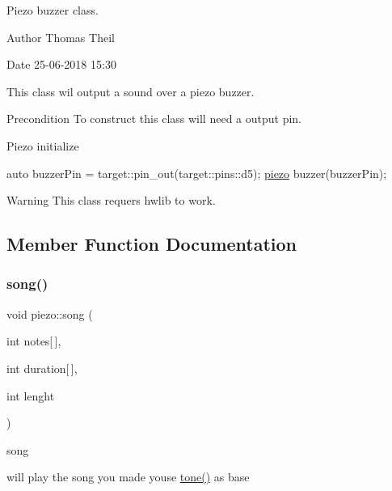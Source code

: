 Piezo buzzer class. 

\begin{DoxyAuthor}{Author}
Thomas Theil 
\end{DoxyAuthor}
\begin{DoxyDate}{Date}
25-\/06-\/2018 15\+:30
\end{DoxyDate}
This class wil output a sound over a piezo buzzer. ~\newline
 \begin{DoxyPrecond}{Precondition}
To construct this class will need a output pin. 
\end{DoxyPrecond}
Piezo initialize 
\begin{DoxyCode}
\textcolor{keyword}{auto} buzzerPin  = target::pin\_out(target::pins::d5);
\mbox{\hyperlink{classpiezo}{piezo}} buzzer(buzzerPin);
\end{DoxyCode}


\begin{DoxyWarning}{Warning}
This class requers hwlib to work. 
\end{DoxyWarning}


\subsection{Member Function Documentation}
\mbox{\label{classpiezo_a4e92d8bc5b101f9862a089134518c55f}} 
\subsubsection{\texorpdfstring{song()}{song()}}
{\footnotesize\ttfamily void piezo\+::song (\begin{DoxyParamCaption}\item[{int}]{notes\mbox{[}$\,$\mbox{]},  }\item[{int}]{duration\mbox{[}$\,$\mbox{]},  }\item[{int}]{lenght }\end{DoxyParamCaption})}



song 

will play the song you made youse \mbox{\hyperlink{classpiezo_ac14361f4fb7fe063b8c4455946220ee4}{tone()}} as base


